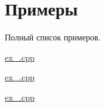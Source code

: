 \section{Примеры}
Полный список примеров.\begin{DoxyCompactItemize}
\item 
\hyperlink{ex_001_8cpp-example}{ex\-\_.\-cpp}
\item 
\hyperlink{ex_002_8cpp-example}{ex\-\_.\-cpp}
\item 
\hyperlink{ex_003_8cpp-example}{ex\-\_.\-cpp}
\end{DoxyCompactItemize}
